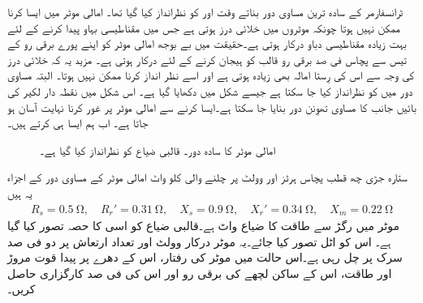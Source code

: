 ٹرانسفارمر کے سادہ ترین مساوی دور بناتے وقت  اور  کو نظرانداز کیا گیا تھا۔ امالی موٹر میں ایسا کرنا ممکن نہیں ہوتا چونکہ موٹروں میں خلائی درز ہوتی ہے جس میں مقناطیسی بہاو پیدا کرنے کے لئے بہت زیادہ مقناطیسی دباو درکار ہوتی ہے۔حقیقت میں بے بوجھ امالی موٹر کو اپنے پورے برقی رو کے تیس سے پچاس فی صد برقی رو قالب کو ہیجان کرنے کے لئے درکار ہوتی ہے۔ مزید یہ کہ خلائی درز کی وجہ سے اس کی رِستا امالہ بھی زیادہ ہوتی ہے اور اسے نظر انداز کرنا ممکن نہیں ہوتا۔ البتہ مساوی دور میں  کو نظرانداز کیا جا سکتا ہے جیسے شکل  میں دکھایا گیا ہے۔ اس شکل میں نقطہ دار لکیر کی بائیں جانب کا مساوی تھوِنن دور بنایا جا سکتا ہے۔ایسا کرنے سے امالی موٹر پر غور کرنا نہایت آسان ہو جاتا ہے۔ اب ہم ایسا ہی کرتے ہیں۔
\begin{figure}
\centering
\caption{امالی موٹر کا سادہ دور۔ قالبی ضیاع کو نظرانداز کیا گیا ہے۔}
\label{شکل_امالی_ساکن_حصے_کا_تھونن_دور}
\end{figure}
%
ستارہ جڑی چھ قطب پچاس ہرٹز اور   وولٹ پر چلنے والی   کلو واٹ امالی موٹر کے مساوی دور کے اجزاء یہ ہیں
\begin{align*}
R_s= \SI{0.5}{\ohm}, \quad R_r'=\SI{0.31}{\ohm}, \quad X_s=\SI{0.9}{\ohm}, \quad X_r'=\SI{0.34}{\ohm}, \quad X_m=\SI{0.22}{\ohm} 
\end{align*}
موٹر میں رگڑ سے طاقت کا ضیاع   واٹ ہے۔قالبی ضیاع کو اسی کا حصہ تصور کیا گیا ہے۔ اس کو اٹل تصور کیا جائے۔یہ موٹر درکار وولٹ اور تعداد ارتعاش پر دو فی صد سرک پر چل رہی ہے۔اس حالت میں موٹر کی رفتار، اس کے دھرے پر پیدا قوت مروڑ اور طاقت، اس کے ساکن لچھے کی برقی رو اور اس کی فی صد کارگزاری حاصل کریں۔

